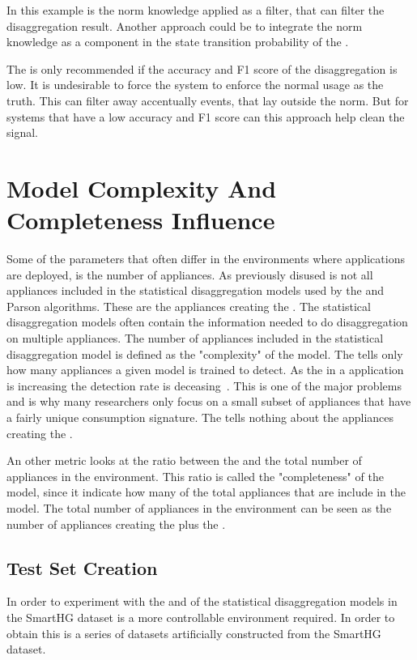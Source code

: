In this example is the norm knowledge applied as a filter, that can filter the disaggregation result. Another approach could be to integrate the norm knowledge as a component in the state transition probability of the .

The  is only recommended if the accuracy and F1 score of the disaggregation is low. It is undesirable to force the system to enforce the normal usage as the truth. This can filter away accentually events, that lay outside the norm. But for systems that have a low accuracy and F1 score can this approach help clean the signal. 

\section{Model Complexity And Completeness Influence }
Some of the parameters that often differ in the environments where applications are deployed, is the number of appliances. As previously disused is not all appliances included in the statistical disaggregation models used by the  and Parson algorithms. These are the appliances creating the . The statistical disaggregation models often contain the information needed to do disaggregation on multiple appliances. The number of appliances included in the statistical disaggregation model is defined as the "complexity" of the model. The  tells only how many appliances a given model is trained to detect. As the  in a  application is increasing the detection rate is deceasing~\citep{RefWorks:34}. This is one of the major problems and is why many researchers only focus on a small subset of appliances that have a fairly unique consumption signature. The  tells nothing about the appliances creating the . 

An other metric looks at the ratio between the  and the total number of appliances in the environment. This ratio is called the "completeness" of the model, since it indicate how many of the total appliances that are include in the model. The total number of appliances in the environment can be seen as the number of appliances creating the  plus the .


\subsection{Test Set Creation}
\label{sec:datasetCreation}
In order to experiment with the  and  of the statistical disaggregation models in the SmartHG dataset is a more controllable environment required. In order to obtain this is a series of datasets artificially constructed from the SmartHG dataset. 

